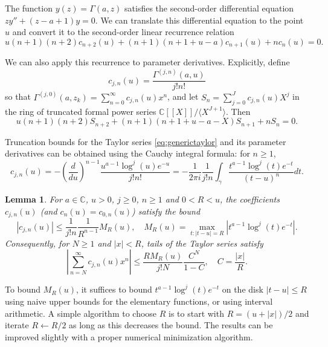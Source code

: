 \documentclass[reqno]{amsart}
\newcommand{\CC}{\mathbb{C}}
\newcommand{\be}{\begin{equation}}
\newcommand{\ee}{\end{equation}}
\newtheorem{lemma}[theorem]{Lemma}
\theoremstyle{definition}
\begin{document}
The function $y(z) = \Gamma(a,z)$ satisfies the
second-order
differential equation $z y'' + (z-a+1) y = 0$.
We can translate this differential equation to the point $u$
and convert it to the second-order linear recurrence relation
\be
u (n+1)(n+2) c_{n+2}(u) + (n+1) (n+1+u-a) c_{n+1}(u) + n c_n(u) = 0.
\ee

We can also apply this recurrence to parameter derivatives.
Explicitly, define
\be
c_{j,n}(u) = \frac{\Gamma^{(j,n)}(a,u)}{j! n!}
\ee
so that $\Gamma^{(j,0)}(a,z_k) = \sum_{n=0}^{\infty} c_{j,n}(u) x^n$,
and let $S_n = \sum_{j=0}^J c_{j,n}(u) X^j$ in the ring
of truncated formal power series $\CC[[X]] / \langle X^{J+1} \rangle$.
Then
\be
u (n+1)(n+2) S_{n+2} + (n+1) (n+1+u-a-X) S_{n+1} + n S_n = 0.
\ee

Truncation bounds for the Taylor series \eqref{eq:generictaylor}
and its parameter derivatives
can be obtained using the Cauchy integral formula:
for $n \ge 1$,
\be
c_{j,n}(u) = -\left(\frac{d}{du}\right)^{n-1} \frac{u^{a-1} \log^j(u) e^{-u}}{j! n!} = -\frac{1}{2 \pi i} \frac{1}{j! n} \int_{\gamma} \frac{t^{a-1} \log^j(t) e^{-t}}{(t-u)^n} dt.
\ee

\begin{lemma}
For $a \in \CC$, $u > 0$, $j \ge 0$, $n \ge 1$ and $0 < R < u$, the coefficients $c_{j,n}(u)$ (and $c_n(u) = c_{0,n}(u)$) satisfy
the bound
\be
|c_{j,n}(u)| \le \frac{1}{j! n} \frac{1}{R^{n-1}} M_R(u), \quad M_R(u) = \max_{t : |t-u| = R} |t^{a-1} \log^j(t) e^{-t}|.
\ee
Consequently, for $N \ge 1$ and $|x| < R$, tails of the Taylor series satisfy
\be
\left| \sum_{n=N}^{\infty} c_{j,n}(u) x^n \right| \le \frac{R M_R(u)}{j! N} \frac{C^N}{1 - C}, \quad C = \frac{|x|}{R}.
\ee
\end{lemma}

To bound $M_R(u)$,
it suffices to bound $t^{a-1} \log^j(t) e^{-t}$ on the disk $|t-u| \le R$
using naive upper bounds for the elementary functions,
or using interval arithmetic.
A simple algorithm to choose $R$ is to start with $R = (u+|x|)/2$
and iterate $R \gets R / 2$ as long as this decreases the bound.
The results can be improved slightly with a proper numerical minimization algorithm.

\end{document}
